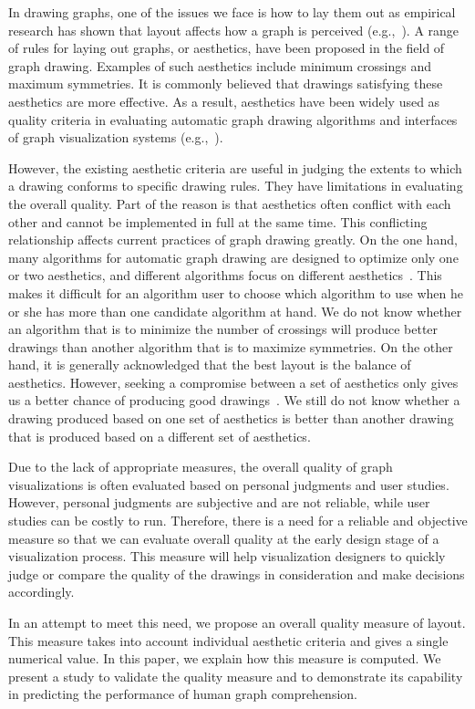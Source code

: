 \documentclass[conference,letterpaper]{IEEEtran}
\begin{document}
In drawing graphs, one of the issues we face is how to lay them out as empirical research has shown that layout affects how a graph is perceived (e.g.,~\cite{huang05}). A range of rules for laying out graphs, or aesthetics, have been proposed in the field of graph drawing. Examples of such aesthetics include minimum crossings and maximum symmetries. It is commonly believed that drawings satisfying these aesthetics are more effective. As a result, aesthetics have been widely used as quality criteria in evaluating automatic graph drawing algorithms and interfaces of graph visualization systems (e.g.,~\cite{dunne,didimo}).

However, the existing aesthetic criteria are useful in judging the extents to which a drawing conforms to specific drawing rules. They have limitations in evaluating the overall quality. Part of the reason is that aesthetics often conflict with each other and cannot be implemented in full at the same time. This conflicting relationship affects current practices of graph drawing greatly. On the one hand, many algorithms for automatic graph drawing are designed to optimize only one or two aesthetics, and different algorithms focus on different aesthetics~\cite{di}. This makes it difficult for an algorithm user to choose which algorithm to use when he or she has more than one candidate algorithm at hand. We do not know whether an algorithm that is to minimize the number of crossings will produce better drawings than another algorithm that is to maximize symmetries. On the other hand, it is generally acknowledged that the best layout is the balance of aesthetics. However, seeking a compromise between a set of aesthetics only gives us a better chance of producing good drawings~\cite{huang10}. We still do not know whether a drawing produced based on one set of aesthetics is better than another drawing that is produced based on a different set of aesthetics. 

Due to the lack of appropriate measures, the overall quality of graph visualizations is often evaluated based on personal judgments and user studies. However, personal judgments are subjective and are not reliable, while user studies can be costly to run. Therefore, there is a need for a reliable and objective measure so that we can evaluate overall quality at the early design stage of a visualization process. This measure will help visualization designers to quickly judge or compare the quality of the drawings in consideration and make decisions accordingly. 

In an attempt to meet this need, we propose an overall quality measure of layout. This measure takes into account individual aesthetic criteria and gives a single numerical value. In this paper, we explain how this measure is computed. We present a study to validate the quality measure and to demonstrate its capability in predicting the performance of human graph comprehension.
\end{document}
